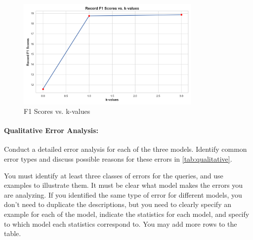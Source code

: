 \documentclass{article}
\begin{document}
\begin{figure}[h]
    \centering
    \includegraphics[width=0.8\textwidth]{Figure_1.png}
    \caption{F1 Scores vs. k-values}
    \label{fig:Figure_1}
\end{figure}

\newpage

\paragraph{Qualitative Error Analysis:} Conduct a detailed error analysis for each of the three models. Identify common error types and discuss possible reasons for these errors in \autoref{tab:qualitative}.

You must identify at least three classes of errors for the queries, and use examples to illustrate them.
It must be clear what model makes the errors you are analyzing. 
If you identified the same type of error for different models, you don't need to duplicate the descriptions, but you need to clearly specify an example for each of the model, indicate the statistics for each model, and specify to which model each statistics correspond to.
You may add more rows to the table.
\end{document}

